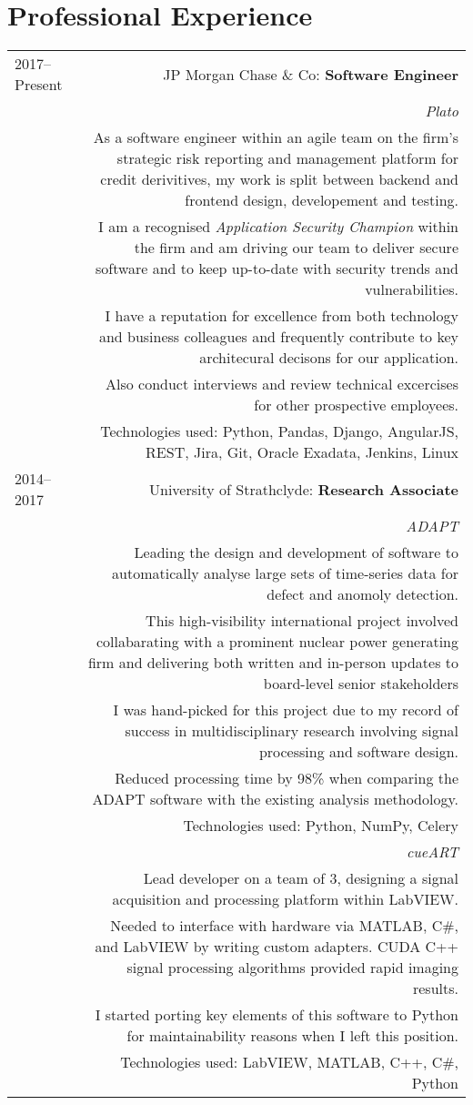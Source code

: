 \section*{Professional Experience}
\begin{longtable}{L!{\VRule}R}
2017--Present&JP Morgan Chase \& Co: \textbf{Software Engineer}\\[5pt]
& \textit{Plato} \\[5pt]
& As a software engineer within an agile team on the firm's strategic risk reporting and management platform for credit derivitives, my work is split between backend and frontend design, developement and testing. \\[5pt]
& I am a recognised \textit{Application Security Champion} within the firm and am driving our team to deliver secure software and to keep up-to-date with security trends and vulnerabilities. \\[5pt]
& I have a reputation for excellence from both technology and business colleagues and frequently contribute to key architecural decisons for our application. \\[5pt]
& Also conduct interviews and review technical excercises for other prospective employees. \\[5pt]
& Technologies used: Python, Pandas, Django, AngularJS, REST, Jira, Git, Oracle Exadata, Jenkins, Linux\\[5pt]

2014--2017&University of Strathclyde: \textbf{Research Associate}\\[5pt]
& \textit{ADAPT}\\[5pt]
& Leading the design and development of software to automatically analyse large sets of time-series data for defect and anomoly detection. \\[5pt]
& This high-visibility international project involved collabarating with a prominent nuclear power generating firm and delivering both written and in-person updates to board-level senior stakeholders \\[5pt]
& I was hand-picked for this project due to my record of success in multidisciplinary research involving signal processing and software design. \\[5pt]
& Reduced processing time by 98\% when comparing the ADAPT software with the existing analysis methodology. \\ [5pt]
& Technologies used: Python, NumPy, Celery \\[5pt]
& \textit{cueART}\\[5pt]
& Lead developer on a team of 3, designing a signal acquisition and processing platform within LabVIEW. \\ [5pt]
& Needed to interface with hardware via MATLAB, C\#, and LabVIEW by writing custom adapters. CUDA C++ signal processing algorithms provided rapid imaging results. \\[5pt]
& I started porting key elements of this software to Python for maintainability reasons when I left this position. \\ [5pt]
& Technologies used: LabVIEW, MATLAB, C++, C\#, Python \\[5pt]
\end{longtable}